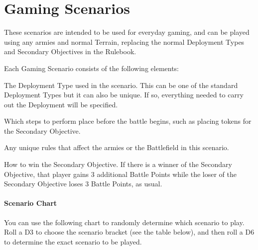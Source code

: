 \part*{Gaming Scenarios}
\label{gaming_scenarios}

These scenarios are intended to be used for everyday gaming, and can be played using any armies and normal Terrain, replacing the normal Deployment Types and Secondary Objectives in the Rulebook.

Each Gaming Scenario consists of the following elements:

\startgamingscenarioheadings%
 The Deployment Type used in the scenario. This can be one of the standard Deployment Types but it can also be unique. If so, everything needed to carry out the Deployment will be specified.

 Which steps to perform place before the battle begins, such as placing tokens for the Secondary Objective. 

 Any unique rules that affect the armies or the Battlefield in this scenario.

 How to win the Secondary Objective. If there is a winner of the Secondary Objective, that player gains 3 additional Battle Points while the loser of the Secondary Objective loses 3 Battle Points, as usual.
\closegamingscenarioheadings%

\subsection*{Scenario Chart}

You can use the following chart to randomly determine which scenario to play. Roll a D3 to choose the scenario bracket (see the table below), and then roll a D6 to determine the exact scenario to be played.


